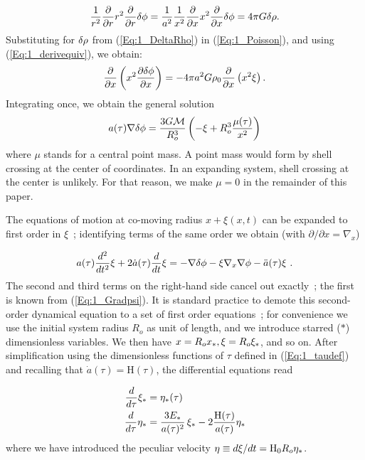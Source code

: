 \begin{equation} 
\label{Eq:1_Poisson} 
\frac{1}{r^2}\frac{\partial}{\partial r} r^2\frac{\partial}{\partial r} \delta\phi =\frac{1}{a^2}\frac{1}{x^2}\frac{\partial}{\partial x} x^2\frac{\partial}{\partial x} \delta\phi  = 4\pi G\delta\rho .
\end{equation}
Substituting for $\delta\rho$ from (\ref{Eq:1_DeltaRho}) in (\ref{Eq:1_Poisson}), and using (\ref{Eq:1_derivequiv}), we obtain:
\begin{equation}
\frac{\partial}{\partial x} \left( x^2 \frac{\partial \delta\phi}{\partial x} \right) = - 4\pi a^2 G \rho_0 \frac{\partial}{\partial x} \left( x^2 \xi \right).
\end{equation}
Integrating once, we obtain the general solution
\begin{equation}
\label{Eq:1_Gradpsi} 
a(\tau)\nabla \delta\phi = \frac{3G{\cal M}}{R_o^3} \left( - \xi + R_o^3\frac{\mu(\tau)}{x^2} \right) 
\end{equation}
where $\mu$ stands for a central point mass. A point mass would form by shell crossing at the center of coordinates. In an expanding system, shell crossing at the center is unlikely. For that reason, we make $ \mu = 0$ in the remainder of this paper.

The equations of motion at co-moving radius $x +\xi(x,t)$ can be expanded to first order in $\xi$~; identifying terms of the same order we obtain (with $\partial/\partial x = \nabla_x$)

\begin{equation} 
a(\tau) \frac{d^2}{d t^2} \xi + 2 \dot{a}(\tau) \frac{d}{dt}\xi = - \nabla\delta\phi - \xi \nabla_x \nabla\phi - \ddot{a}(\tau)\xi \ . 
\end{equation} 
The second and third terms on the right-hand side cancel out exactly~; the first is known from (\ref{Eq:1_Gradpsi}). 
It is standard practice to demote this second-order dynamical equation to a set of first order equations~; for convenience we use the initial system radius $R_o$ as unit of length,  and we introduce starred ($\ast$) dimensionless variables. We then have $x = R_o x_\ast, \xi = R_o\xi_\ast$, and so on.  After simplification using the dimensionless functions of $\tau$  defined in (\ref{Eq:1_taudef}) and recalling that $\dot{a}(\tau) = \textrm{H}(\tau)$, the differential equations read

\begin{subequations}
 \label{Eq:1_system}
    \begin{align}
    	\label{Eq:1_systema}
		\frac{d}{d\tau} \xi_\ast &=  \eta_\ast(\tau)  \\ 
		\label{Eq:1_systemb}
		\frac{d}{d\tau} \eta_\ast &= \frac{3 E_\ast}{a(\tau)^2}\,\xi_\ast - 2 		\frac{\textrm{H}(\tau)}{a(\tau)} \eta_\ast   
	\end{align}
\end{subequations}
where we have introduced the peculiar velocity $\eta \equiv d\xi/dt = {\textrm{H}}_0R_o \eta_\ast$.  


